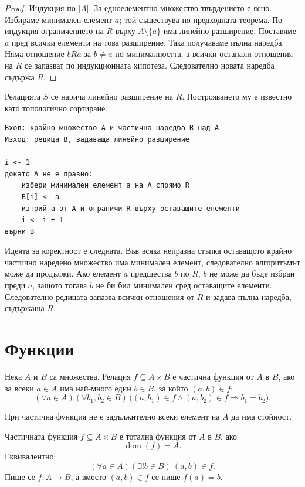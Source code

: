 \begin{proof}
Индукция по $|A|$. За едноелементно множество твърдението е ясно. Избираме минимален елемент $a$; той съществува по предходната теорема. По индукция ограничението на $R$ върху $A\setminus\{a\}$ има линейно разширение. Поставяме $a$ пред всички елементи на това разширение. Така получаваме пълна наредба. Няма отношение $bRa$ за $b\ne a$ по минималността, а всички останали отношения на $R$ се запазват по индукционната хипотеза. Следователно новата наредба съдържа $R$.
\end{proof}

\begin{defn}
Релацията $S$ се нарича линейно разширение на $R$. Построяването му е известно като топологично сортиране.
\end{defn}

\begin{verbatim}
Вход: крайно множество A и частична наредба R над A
Изход: редица B, задаваща линейно разширение

i <- 1
докато A не е празно:
    избери минимален елемент a на A спрямо R
    B[i] <- a
    изтрий a от A и ограничи R върху оставащите елементи
    i <- i + 1
върни B
\end{verbatim}

Идеята за коректност е следната. Във всяка непразна стъпка оставащото крайно частично наредено множество има минимален елемент, следователно алгоритъмът може да продължи. Ако елемент $a$ предшества $b$ по $R$, $b$ не може да бъде избран преди $a$, защото тогава $b$ не би бил минимален сред оставащите елементи. Следователно редицата запазва всички отношения от $R$ и задава пълна наредба, съдържаща $R$.

\section{Функции}\label{s:1.6}

\begin{keydefn}
Нека $A$ и $B$ са множества. Релация $f\subseteq A\times B$ е частична функция от $A$ в $B$, ако за всеки $a\in A$ има най-много един $b\in B$, за който $(a,b)\in f$:
\[
(\forall a\in A)(\forall b_1,b_2\in B)\,
\bigl((a,b_1)\in f\land(a,b_2)\in f\Rightarrow b_1=b_2\bigr).
\]
\end{keydefn}

При частична функция не е задължително всеки елемент на $A$ да има стойност.

\begin{keydefn}
Частичната функция $f\subseteq A\times B$ е тотална функция от $A$ в $B$, ако
\[
\operatorname{dom}(f)=A.
\]
Еквивалентно:
\[
(\forall a\in A)(\exists!b\in B)\ (a,b)\in f.
\]
Пише се $f:A\to B$, а вместо $(a,b)\in f$ се пише $f(a)=b$.
\end{keydefn}

